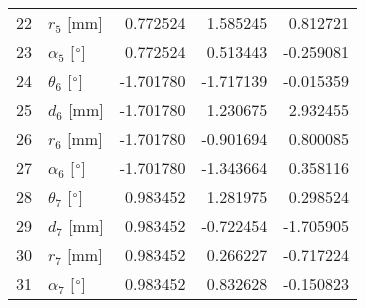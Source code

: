 \documentclass{standalone}%
\begin{document}
\begin{tabular}{llrrr}
22 &              $r_{5}$ [mm] &  0.772524 &   1.585245 &   0.812721 \\
23 &  $\alpha_{5}$ [$\degree$] &  0.772524 &   0.513443 &  -0.259081 \\
24 &  $\theta_{6}$ [$\degree$] & -1.701780 &  -1.717139 &  -0.015359 \\
25 &              $d_{6}$ [mm] & -1.701780 &   1.230675 &   2.932455 \\
26 &              $r_{6}$ [mm] & -1.701780 &  -0.901694 &   0.800085 \\
27 &  $\alpha_{6}$ [$\degree$] & -1.701780 &  -1.343664 &   0.358116 \\
28 &  $\theta_{7}$ [$\degree$] &  0.983452 &   1.281975 &   0.298524 \\
29 &              $d_{7}$ [mm] &  0.983452 &  -0.722454 &  -1.705905 \\
30 &              $r_{7}$ [mm] &  0.983452 &   0.266227 &  -0.717224 \\
31 &  $\alpha_{7}$ [$\degree$] &  0.983452 &   0.832628 &  -0.150823 \\
\bottomrule
\end{tabular}
%
\end{document}
